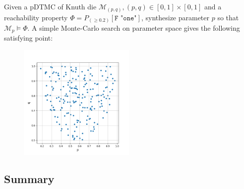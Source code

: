 \begin{example}
    Given a pDTMC of Knuth die $\mathcal{M}_{(p,q)}, (p,q)\in[0,1]\times[0,1] $ and a reachability property $\Phi = P_(\geq 0.2)
        [\texttt{F "one"}]$, synthesize parameter $p$ so that $\mathcal{M}_{p} \models \Phi$. A simple
    Monte-Carlo search on parameter space gives the following satisfying point:
    \begin{figure}[H]
        \centering
        \includegraphics[width=0.5\textwidth]{figures/knuth_die_trueparams.png}
        \label{fig:knuth-die-pq}
    \end{figure}
\end{example}

\subsection{Summary}